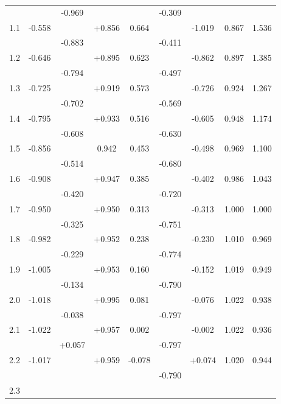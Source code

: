 \begin{longtable}{|c|c|c|c|c|c|c|c|c|}
    ~ & ~ & -0.969 & ~ & ~ & -0.309 & ~ & ~ & ~ \\ 
    1.1 & -0.558 & ~ & +0.856 & 0.664 & ~ & -1.019 & 0.867 & 1.536 \\ 
    ~ & ~ & -0.883 & ~ & ~ & -0.411 & ~ & ~ & ~ \\ 
    1.2 & -0.646 & ~ & +0.895 & 0.623 & ~ & -0.862 & 0.897 & 1.385 \\ 
    ~ & ~ & -0.794 & ~ & ~ & -0.497 & ~ & ~ & ~ \\ 
    1.3 & -0.725 & ~ & +0.919 & 0.573 & ~ & -0.726 & 0.924 & 1.267 \\ 
    ~ & ~ & -0.702 & ~ & ~ & -0.569 & ~ & ~ & ~ \\ 
    1.4 & -0.795 & ~ & +0.933 & 0.516 & ~ & -0.605 & 0.948 & 1.174 \\ 
    ~ & ~ & -0.608 & ~ & ~ & -0.630 & ~ & ~ & ~ \\ 
    1.5 & -0.856 & ~ & 0.942 & 0.453 & ~ & -0.498 & 0.969 & 1.100 \\ 
    ~ & ~ & -0.514 & ~ & ~ & -0.680 & ~ & ~ & ~ \\ 
    1.6 & -0.908 & ~ & +0.947 & 0.385 & ~ & -0.402 & 0.986 & 1.043 \\ 
    ~ & ~ & -0.420 & ~ & ~ & -0.720 & ~ & ~ & ~ \\ 
    1.7 & -0.950 & ~ & +0.950 & 0.313 & ~ & -0.313 & 1.000 & 1.000 \\ 
    ~ & ~ & -0.325 & ~ & ~ & -0.751 & ~ & ~ & ~ \\ 
    1.8 & -0.982 & ~ & +0.952 & 0.238 & ~ & -0.230 & 1.010 & 0.969 \\ 
    ~ & ~ & -0.229 & ~ & ~ & -0.774 & ~ & ~ & ~ \\ 
    1.9 & -1.005 & ~ & +0.953 & 0.160 & ~ & -0.152 & 1.019 & 0.949 \\ 
    ~ & ~ & -0.134 & ~ & ~ & -0.790 & ~ & ~ & ~ \\ 
    2.0 & -1.018 & ~ & +0.995 & 0.081 & ~ & -0.076 & 1.022 & 0.938 \\ 
    ~ & ~ & -0.038 & ~ & ~ & -0.797 & ~ & ~ & ~ \\ 
    2.1 & -1.022 & ~ & +0.957 & 0.002 & ~ & -0.002 & 1.022 & 0.936 \\ 
    ~ & ~ & +0.057 & ~ & ~ & -0.797 & ~ & ~ & ~ \\ 
    2.2 & -1.017 & ~ & +0.959 & -0.078 & ~ & +0.074 & 1.020 & 0.944 \\ 
    ~ & ~ & ~ & ~ & ~ & -0.790 & ~ & ~ & ~ \\ 
    2.3 & ~ & ~ & ~ & ~ & ~ & ~ & ~ & ~ \\ \hline
\end{longtable}

